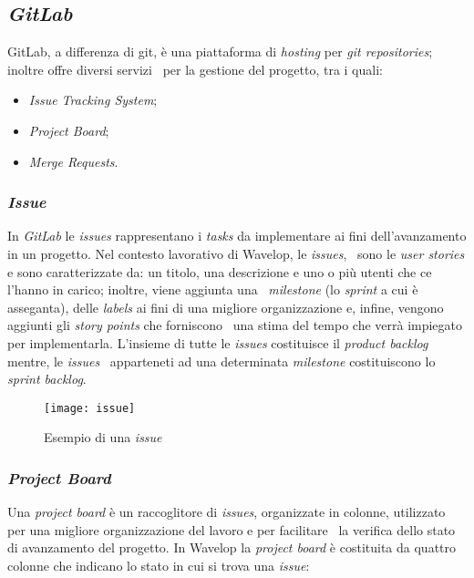 \subsection{\emph{GitLab}}
GitLab, a differenza di git, è una piattaforma di \emph{hosting} per \emph{git repositories}; inoltre offre diversi servizi \
per la gestione del progetto, tra i quali:

\begin{itemize}
  \item \emph{Issue Tracking System};
  \item \emph{Project Board};
  \item \emph{Merge Requests}.
\end{itemize}

\subsubsection{\emph{Issue}}
In \emph{GitLab} le \emph{issues} rappresentano i \emph{tasks} da implementare ai fini dell'avanzamento in un progetto. Nel contesto lavorativo di Wavelop, le \emph{issues}, \
sono le \emph{user stories} e sono caratterizzate da: un titolo, una descrizione e uno o più utenti che ce l'hanno in carico; inoltre, viene aggiunta una \
\emph{milestone} (lo \emph{sprint} a cui è asseganta), delle \emph{labels} ai fini di una migliore organizzazione e, infine, vengono aggiunti gli \emph{story points} che forniscono \
una stima del tempo che verrà impiegato per implementarla. L'insieme di tutte le \emph{issues} costituisce il \emph{product backlog} mentre, le \emph{issues} \
apparteneti ad una determinata \emph{milestone} costituiscono lo \emph{sprint backlog}.
\begin{figure}[!ht]
  \begin{center}
    \texttt{[image: issue]}
    \caption{Esempio di una \emph{issue}}
  \end{center}
\end{figure}

\subsubsection{\emph{Project Board}}
Una \emph{project board} è un raccoglitore di \emph{issues}, organizzate in colonne, utilizzato per una migliore organizzazione del lavoro e per facilitare \
la verifica dello stato di avanzamento del progetto. In Wavelop la \emph{project board} è costituita da quattro colonne che indicano lo stato in cui si trova una \emph{issue}:

